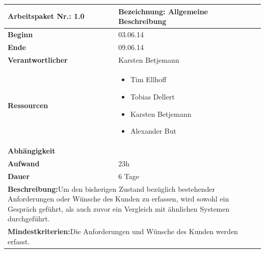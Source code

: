 \documentclass[fontsize=12pt,paper=a4,twoside]{scrartcl}
\begin{document}
	\begin{verbatim} 
	\end{verbatim}
	
	\begin{tabular}{|p{5.3cm}|p{9.7cm}|}\hline
		\textbf{Arbeitspaket Nr.:} 1.0 & \textbf{Bezeichnung:} Allgemeine Beschreibung\\  \hline \hline
		\textbf{Beginn} & 03.06.14\\ \hline
		\textbf{Ende} & 09.06.14\\ \hline
		\textbf{Verantwortlicher} & Karsten Betjemann\\ \hline
		\textbf{Ressourcen} & \begin{itemize}
			\item Tim Ellhoff
			\item Tobias Dellert
			\item Karsten Betjemann
			\item Alexander But
		\end{itemize}    \\ \hline
		\textbf{Abhängigkeit} & \\ \hline
		\textbf{Aufwand} & 23h \\ \hline
		\textbf{Dauer} & 6 Tage\\ \hline
		\multicolumn{2}{|p{15cm}|}{\textbf{Beschreibung:}\newline Um den bisherigen Zustand bezüglich bestehender Anforderungen oder Wünsche des Kunden zu erfassen, wird sowohl ein Gespräch geführt, als auch zuvor ein Vergleich mit ähnlichen Systemen durchgeführt.   }\\ \hline
		\multicolumn{2}{|p{15cm}|}{\textbf{Mindestkriterien:}\newline Die Anforderungen und Wünsche des Kunden werden erfasst.}\\ \hline
	\end{tabular}
	
	\begin{verbatim} 
	\end{verbatim}
	
\end{document}
